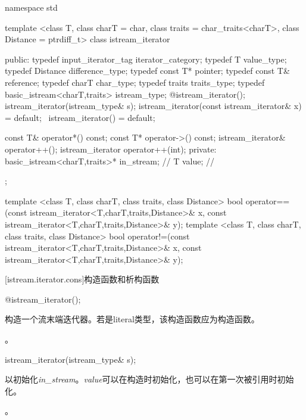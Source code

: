 \begin{codeblock}
namespace std {
  template <class T, class charT = char, class traits = char_traits<charT>,
      class Distance = ptrdiff_t>
  class istream_iterator {
  public:
    typedef input_iterator_tag iterator_category;
    typedef T value_type;
    typedef Distance difference_type;
    typedef const T* pointer;
    typedef const T& reference;
    typedef charT char_type;
    typedef traits traits_type;
    typedef basic_istream<charT,traits> istream_type;
    @\seebelow@ istream_iterator();
    istream_iterator(istream_type& s);
    istream_iterator(const istream_iterator& x) = default;
   ~istream_iterator() = default;

    const T& operator*() const;
    const T* operator->() const;
    istream_iterator& operator++();
    istream_iterator  operator++(int);
  private:
    basic_istream<charT,traits>* in_stream; // \expos
    T value;                                // \expos
  };

  template <class T, class charT, class traits, class Distance>
    bool operator==(const istream_iterator<T,charT,traits,Distance>& x,
            const istream_iterator<T,charT,traits,Distance>& y);
  template <class T, class charT, class traits, class Distance>
    bool operator!=(const istream_iterator<T,charT,traits,Distance>& x,
            const istream_iterator<T,charT,traits,Distance>& y);
}
\end{codeblock}

[istream.iterator.cons]{构造函数和析构函数}


%
\begin{itemdecl}
@\seebelow@ istream_iterator();
\end{itemdecl}

\begin{itemdescr}
\pnum
\effects
构造一个流末端迭代器。若是literal类型，该构造函数应为构造函数。

\pnum
\postcondition {}。
\end{itemdescr}


%
\begin{itemdecl}
istream_iterator(istream_type& s);
\end{itemdecl}

\begin{itemdescr}
\pnum
\effects
以初始化\textit{in_stream}。\textit{value}可以在构造时初始化，也可以在第一次被引用时初始化。

\pnum
\postcondition {}。
\end{itemdescr}


